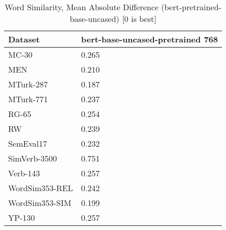 \begin{table}[]
\centering
\begin{tabular}{l|l}
\hline
Dataset & bert-base-uncased-pretrained 768 \\
\hline
MC-30 & 0.265 \\ 
MEN & 0.210 \\ 
MTurk-287 & 0.187 \\ 
MTurk-771 & 0.237 \\ 
RG-65 & 0.254 \\ 
RW & 0.239 \\ 
SemEval17 & 0.232 \\ 
SimVerb-3500 & 0.751 \\ 
Verb-143 & 0.257 \\ 
WordSim353-REL & 0.242 \\ 
WordSim353-SIM & 0.199 \\ 
YP-130 & 0.257
\end{tabular}
\caption{Word Similarity, Mean Absolute Difference (bert-pretrained-base-uncased) [0 is best]}
\label{tab:similarity-bert-pretrained-base-uncased}
\end{table}
